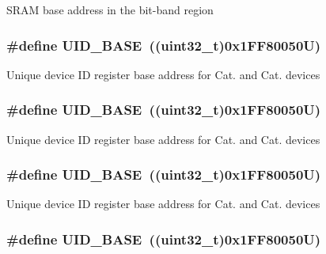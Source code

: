 S\-R\-A\-M base address in the bit-\/band region \hypertarget{group___peripheral__memory__map_ga664eda42b83c919b153b07b23348be67}{
\subsubsection[{U\-I\-D\-\_\-\-B\-A\-S\-E}]{\setlength{\rightskip}{0pt plus 5cm}\#define U\-I\-D\-\_\-\-B\-A\-S\-E~((uint32\-\_\-t)0x1\-F\-F80050\-U)}}\label{group___peripheral__memory__map_ga664eda42b83c919b153b07b23348be67}
Unique device I\-D register base address for Cat. and Cat. devices \hypertarget{group___peripheral__memory__map_ga664eda42b83c919b153b07b23348be67}{
\subsubsection[{U\-I\-D\-\_\-\-B\-A\-S\-E}]{\setlength{\rightskip}{0pt plus 5cm}\#define U\-I\-D\-\_\-\-B\-A\-S\-E~((uint32\-\_\-t)0x1\-F\-F80050\-U)}}\label{group___peripheral__memory__map_ga664eda42b83c919b153b07b23348be67}
Unique device I\-D register base address for Cat. and Cat. devices \hypertarget{group___peripheral__memory__map_ga664eda42b83c919b153b07b23348be67}{
\subsubsection[{U\-I\-D\-\_\-\-B\-A\-S\-E}]{\setlength{\rightskip}{0pt plus 5cm}\#define U\-I\-D\-\_\-\-B\-A\-S\-E~((uint32\-\_\-t)0x1\-F\-F80050\-U)}}\label{group___peripheral__memory__map_ga664eda42b83c919b153b07b23348be67}
Unique device I\-D register base address for Cat. and Cat. devices \hypertarget{group___peripheral__memory__map_ga664eda42b83c919b153b07b23348be67}{
\subsubsection[{U\-I\-D\-\_\-\-B\-A\-S\-E}]{\setlength{\rightskip}{0pt plus 5cm}\#define U\-I\-D\-\_\-\-B\-A\-S\-E~((uint32\-\_\-t)0x1\-F\-F80050\-U)}}\label{group___peripheral__memory__map_ga664eda42b83c919b153b07b23348be67}
